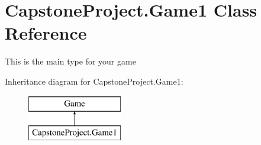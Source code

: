 \hypertarget{class_capstone_project_1_1_game1}{\section{Capstone\-Project.\-Game1 Class Reference}
\label{class_capstone_project_1_1_game1}
}


This is the main type for your game  


Inheritance diagram for Capstone\-Project.\-Game1\-:\begin{figure}[H]
\begin{center}
\leavevmode
\includegraphics[height=2.000000cm]{class_capstone_project_1_1_game1}
\end{center}
\end{figure}
